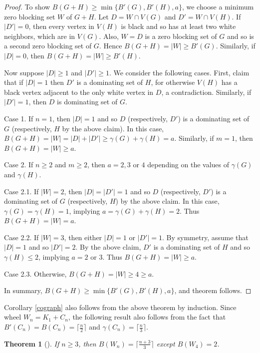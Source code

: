 \documentclass[preprint,12pt]{elsarticle}
\newtheorem{theorem}{Theorem}
\begin{document}
{\begin{proof}
To show $B(G+H)\ge \min\{B'(G),B'(H),a\}$,
we choose a minimum zero blocking set $W$ of $G+H$.
Let $D=W\cap V(G)$ and $D'=W\cap V(H)$.
If $|D'|=0$, then every vertex in $V(H)$ is black and so has at least two white neighbors, which are in $V(G)$.
Also, $W=D$ is a zero blocking set of $G$ and so is a second zero blocking set of $G$.
Hence $ B(G+H) =  |W|\ge B'(G)$.
Similarly, if $|D|=0$, then $B(G+H) =  |W|\ge B'(H)$.

Now suppose $|D|\ge 1$ and $|D'|\ge 1$.
We consider the following cases. First, claim that if $|D|=1$ then $D'$ is a dominating set of $H$,
for otherwise $V(H)$ has a black vertex adjacent to the only white vertex in $D$,
a contradiction.
Similarly, if $|D'|=1$, then $D$ is dominating set of $G$.

Case 1.
If $n=1$, then $|D|=1$ and so $D$ (respectively, $D'$) is a dominating set of $G$ (respectively, $H$ by the above claim).
In this case, $ B(G+H) =  |W|=|D|+|D'|\ge \gamma(G)+\gamma(H)=a$.
Similarly, if $m=1$, then $ B(G+H) = |W|\ge a$.

Case 2.
If $n\geq 2$ and $m\ge 2$,
then $a=2,3$ or $4$ depending on the values of $\gamma(G)$ and $\gamma(H)$.

Case 2.1.
If $|W|=2$, then $|D|=|D'|=1$ and so $D$ (respectively, $D'$) is a dominating set of $G$ (respectively, $H$) by the above claim.
In this case, $\gamma(G)=\gamma(H)=1$, implying $a=\gamma(G)+\gamma(H)=2$.
Thus $ B(G+H) = |W|=a$.

Case 2.2.
If $|W|=3$, then either $|D|=1$ or $|D'|=1$.
By symmetry, assume that $|D|=1$ and so $|D'|=2$.
By the above claim, $D'$ is a dominating set of $H$
and so $\gamma(H)\le 2$, implying $a=2$ or $3$.
Thus $B(G+H) = |W|\ge a$.

Case 2.3.
Otherwise, $B(G+H) = |W|\ge 4\ge a$.
 
In summary, $B(G+H)\ge \min\{B'(G),B'(H),a\}$,
and theorem follows.
\end{proof}

Corollary \ref{cograph} also follows from the above theorem by induction.
Since wheel $W_n=K_1+C_n$, the following result also follows from the fact that
$B'(C_n)=B(C_n)=\lceil\frac{n}{2}\rceil$ and $\gamma(C_n)=\lceil\frac{n}{3}\rceil$.

\begin{theorem} [\cite{2015fjs}]
If $n\ge 3$, then $B(W_n)=\lceil\frac{n+3}{3}\rceil$ except $B(W_4)=2$.
\end{theorem}

}
\end{document}
